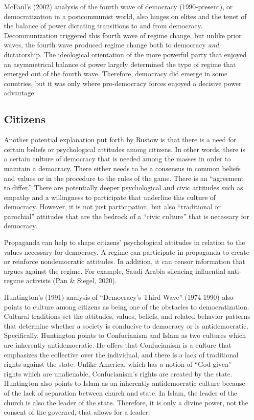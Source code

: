 \documentclass[12pt,]{article}
\begin{document}
McFaul's (2002) analysis of the fourth wave of democracy (1990-present),
or democratization in a postcommunist world, also hinges on elites and
the tenet of the balance of power dictating transitions to and from
democracy. Decommunization triggered this fourth wave of regime change,
but unlike prior waves, the fourth wave produced regime change both to
democracy \emph{and} dictatorship. The ideological orientation of the
more powerful party that enjoyed an asymmetrical balance of power
largely determined the type of regime that emerged out of the fourth
wave. Therefore, democracy did emerge in some countries, but it was only
where pro-democracy forces enjoyed a decisive power advantage.

\hypertarget{citizens}{%
\subsection{Citizens}\label{citizens}}

Another potential explanation put forth by Rustow is that there is a
need for certain beliefs or psychological attitudes among citizens. In
other words, there is a certain culture of democracy that is needed
among the masses in order to maintain a democracy. There either needs to
be a consensus in common beliefs and values or in the procedure to the
rules of the game. There is an ``agreement to differ.'' There are
potentially deeper psychological and civic attitudes such as empathy and
a willingness to participate that underline this culture of democracy.
However, it is not just participation, but also ``traditional or
parochial'' attitudes that are the bedrock of a ``civic culture'' that
is necessary for democracy.

Propaganda can help to shape citizens' psychological attitudes in
relation to the values necessary for democracy. A regime can participate
in propaganda to create or reinforce nondemocratic attitudes. In
addition, it can censor information that argues against the regime. For
example, Saudi Arabia silencing influential anti-regime activists (Pan
\& Siegel, 2020).

Huntington's (1991) analysis of ``Democracy's Third Wave'' (1974-1990)
also points to culture among citizens as being one of the obstacles to
democratization. Cultural traditions set the attitudes, values, beliefs,
and related behavior patterns that determine whether a society is
conducive to democracy or is antidemocratic. Specifically, Huntington
points to Confucianism and Islam as two cultures which are inherently
antidemocratic. He offers that Confucianism is a culture that emphasizes
the collective over the individual, and there is a lack of traditional
rights against the state. Unlike America, which has a notion of
``God-given'' rights which are unalienable, Confucianism's rights are
created by the state. Huntington also points to Islam as an inherently
antidemocratic culture because of the lack of separation between church
and state. In Islam, the leader of the church is also the leader of the
state. Therefore, it is only a divine power, not the consent of the
governed, that allows for a leader.
\end{document}

